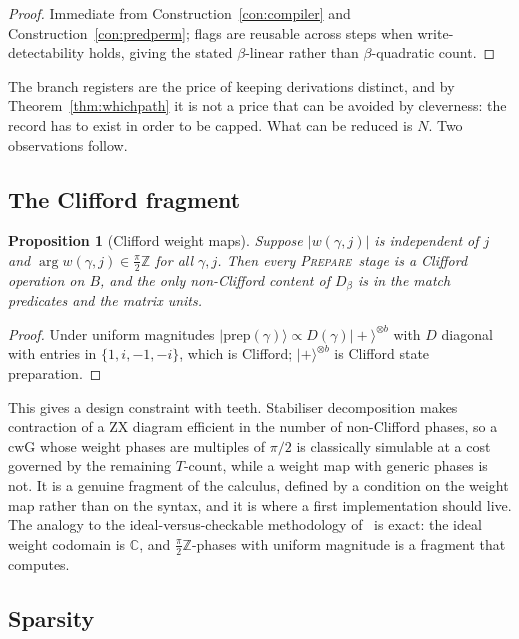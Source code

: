 \documentclass[11pt]{article}
\theoremstyle{definition}
\theoremstyle{plain}
\newtheorem{proposition}[definition]{Proposition}
\newcommand{\PREP}{\textsc{Prepare}}
\newcommand{\ket}[1]{| #1 \rangle}
\newcommand{\cwG}{\mathrm{cwG}}
\begin{document}
\begin{proof}
Immediate from Construction~\ref{con:compiler} and Construction~\ref{con:predperm}; flags are
reusable across steps when write-detectability holds, giving the stated $\beta$-linear rather
than $\beta$-quadratic count.
\end{proof}

The branch registers are the price of keeping derivations distinct, and by
Theorem~\ref{thm:whichpath} it is not a price that can be avoided by cleverness: the record has
to exist in order to be capped. What can be reduced is $N$. Two observations follow.

\subsection{The Clifford fragment}

\begin{proposition}[Clifford weight maps]\label{prop:clifford}
Suppose $|w(\gamma,j)|$ is independent of $j$ and $\arg w(\gamma,j)\in\frac{\pi}{2}\mathbb{Z}$
for all $\gamma,j$. Then every \PREP\ stage is a Clifford operation on $B$, and the only
non-Clifford content of $D_\beta$ is in the match predicates and the matrix units.
\end{proposition}

\begin{proof}
Under uniform magnitudes $\ket{\mathrm{prep}(\gamma)} \propto D(\gamma)\ket{+}^{\otimes b}$ with
$D$ diagonal with entries in $\{1,i,-1,-i\}$, which is Clifford; $\ket{+}^{\otimes b}$ is
Clifford state preparation.
\end{proof}

This gives a design constraint with teeth. Stabiliser decomposition makes contraction of a ZX
diagram efficient in the number of non-Clifford phases, so a $\cwG$ whose weight phases are
multiples of $\pi/2$ is classically simulable at a cost governed by the remaining $T$-count,
while a weight map with generic phases is not. It is a genuine fragment of the calculus, defined
by a condition on the weight map rather than on the syntax, and it is where a first
implementation should live. The analogy to the ideal-versus-checkable methodology
of~\cite{weighted} is exact: the ideal weight codomain is $\mathbb{C}$, and $\frac{\pi}{2}
\mathbb{Z}$-phases with uniform magnitude is a fragment that computes.

\subsection{Sparsity}\label{ssec:sparsity}
\end{document}
